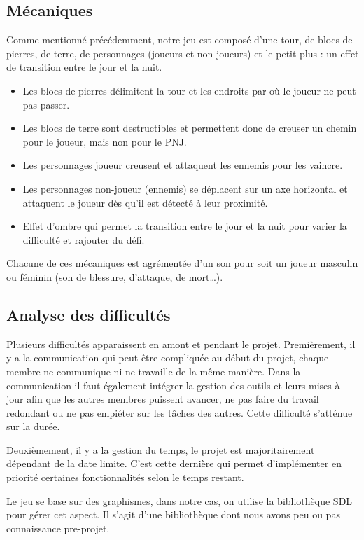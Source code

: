 \documentclass[a4paper,12pt]{article}
\begin{document}
\subsection{Mécaniques}
Comme mentionné précédemment, notre jeu est composé d'une tour, de blocs de pierres, de terre, de personnages (joueurs et non joueurs) et le petit plus : un effet de transition entre le jour et la nuit.
\begin{itemize}
	\item Les blocs de pierres délimitent la tour et les endroits par où le joueur ne peut pas passer.
	\item Les blocs de terre sont destructibles et permettent donc de creuser un chemin pour le joueur, mais non pour le PNJ.
	\item Les personnages joueur creusent et attaquent les ennemis pour les vaincre.
	\item Les personnages non-joueur (ennemis) se déplacent sur un axe horizontal et attaquent le joueur dès qu'il est détecté à leur proximité.
	\item Effet d'ombre qui permet la transition entre le jour et la nuit pour varier la difficulté et rajouter du défi.
\end{itemize}

Chacune de ces mécaniques est agrémentée d'un son pour soit un joueur masculin ou féminin (son de blessure, d'attaque, de mort\dots).


\subsection{Analyse des difficultés}
Plusieurs difficultés apparaissent en amont et pendant le projet. 
Premièrement, il y a la communication qui peut être compliquée au début du projet, chaque membre ne communique ni ne travaille de la même manière. Dans la communication il faut également intégrer la gestion des outils et leurs mises à jour afin que les autres membres puissent avancer, ne pas faire du travail redondant ou ne pas empiéter sur les tâches des autres. Cette difficulté s'atténue sur la durée.

Deuxièmement, il y a la gestion du temps, le projet est majoritairement dépendant de la date limite. C’est cette dernière qui permet d’implémenter en priorité certaines fonctionnalités selon le temps restant.

Le jeu se base sur des graphismes, dans notre cas, on utilise la bibliothèque SDL pour gérer cet aspect. Il s’agit d’une bibliothèque dont nous avons peu ou pas connaissance pre-projet.
\end{document}

